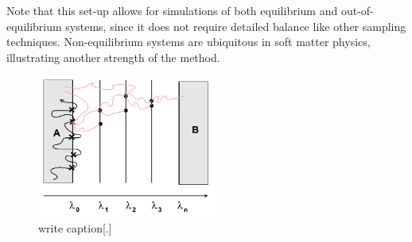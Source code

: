 Note that this set-up allows for simulations of both equilibrium and out-of-equilibrium
systems, since it does not require detailed balance like other sampling techniques.
Non-equilibrium systems are ubiquitous in soft matter physics, illustrating another
strength of the method.
\begin{figure}[ht]
\begin{center}
  \includegraphics[width=0.53\textwidth]{Figures/FFS.png}
  \caption{write caption[.]}
\end{center}
\end{figure}

